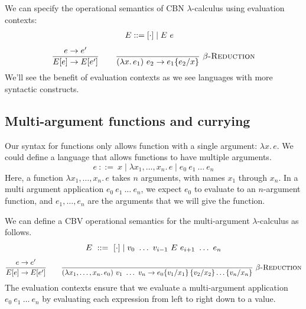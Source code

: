 We can specify the operational semantics of CBN $\lambda$-calculus using evaluation contexts:
\begin{align*}
  E&::=[\cdot]\mid E\ e
\end{align*}
\[
  \rul{e\to e'}{E[e]\to E[e']}
  \qquad
  \infr{}{(\lambda x.\,e_1)\ e_2\to\sub{e_1}{e_2}{x}}{$\beta$-Reduction}
\]
We'll see the benefit of evaluation contexts as we see languages with more syntactic constructs.

\subsection{Multi-argument functions and currying}

Our syntax for functions only allows function with a single argument: $\lambda x.\,e$. We could
define a language that allows functions to have multiple arguments.
\[
  e\ ::=\ x\mid\lambda x_1,\ldots,x_n.\,e\mid e_0\ e_1\ \ldots\ e_n
\]
Here, a function $\lambda x_1,\ldots,x_n.\,e$ takes $n$ arguments, with names $x_1$ through $x_n$.
In a multi argument application $e_0\ e_1\ \ldots\ e_n$, we expect $e_0$ to evaluate to an
$n$-argument function, and $e_1,\ldots,e_n$ are the arguments that we will give the function.

We can define a CBV operational semantics for the multi-argument $\lambda$-calculus as follows.
\[
  E\ ::=\ \hole\mid v_0\ \ldots\ v_{i-1}\ E\ e_{i+1}\ \ldots\ e_n
\]
\[
  \rul{e\to e'}{E[e]\to E[e']}
  \qquad
  \infr{}{(\lambda x_1,\ldots,x_n.\,e_0)\ v_1\ \ldots\ v_n\to\sub{\sub{e_0}{v_1}{x_1}\,\{v_2/x_2\}\ldots}{v_n}{x_n}}{$\beta$-Reduction}
\]
The evaluation contexts ensure that we evaluate a multi-argument application
$e_0\ e_1\ \ldots\ e_n$ by evaluating each expression from left to right down to a value.

